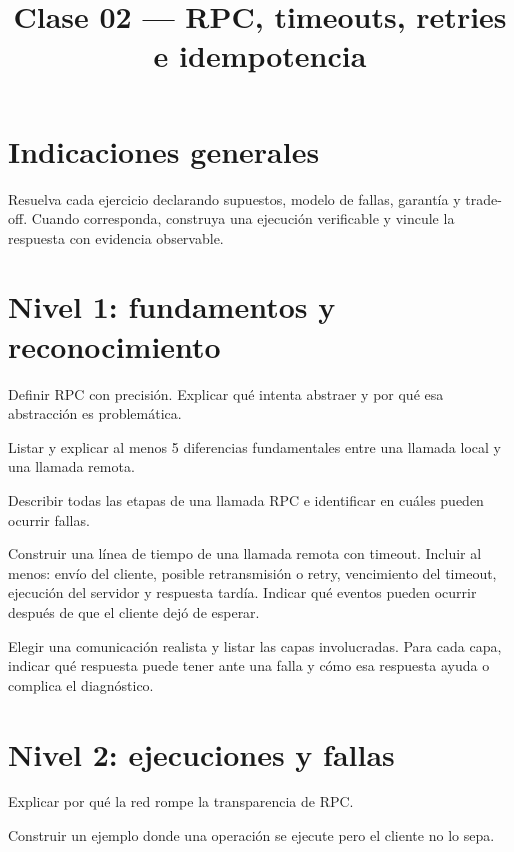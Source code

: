 \documentclass[variant=guia,cover=institutional,mode=screen]{ua-engineering-v6-article}
\title{Clase 02 --- RPC, timeouts, retries e idempotencia}
\author{\UAProfessor}
\date{\UADate}
\begin{document}
\section{Indicaciones generales}
Resuelva cada ejercicio declarando supuestos, modelo de fallas, garantía y trade-off. Cuando corresponda, construya una ejecución verificable y vincule la respuesta con evidencia observable.

\section{Nivel 1: fundamentos y reconocimiento}
\begin{uaexercise}
Definir RPC con precisión. Explicar qué intenta abstraer y por qué esa abstracción es problemática.
\end{uaexercise}

\begin{uaexercise}
Listar y explicar al menos 5 diferencias fundamentales entre una llamada local y una llamada remota.
\end{uaexercise}

\begin{uaexercise}
Describir todas las etapas de una llamada RPC e identificar en cuáles pueden ocurrir fallas.
\end{uaexercise}

\begin{uaexercise}
Construir una línea de tiempo de una llamada remota con timeout. Incluir al menos: envío del cliente, posible retransmisión o retry, vencimiento del timeout, ejecución del servidor y respuesta tardía. Indicar qué eventos pueden ocurrir después de que el cliente dejó de esperar.
\end{uaexercise}

\begin{uaexercise}
Elegir una comunicación realista y listar las capas involucradas. Para cada capa, indicar qué respuesta puede tener ante una falla y cómo esa respuesta ayuda o complica el diagnóstico.
\end{uaexercise}


\section{Nivel 2: ejecuciones y fallas}
\begin{uaexercise}
Explicar por qué la red rompe la transparencia de RPC.
\end{uaexercise}

\begin{uaexercise}
Construir un ejemplo donde una operación se ejecute pero el cliente no lo sepa.
\end{uaexercise}
\end{document}
